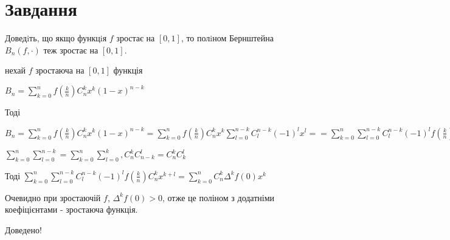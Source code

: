 
\chapter{Завдання \theHchapter}

\begin{tcolorbox}[title=Завдання]
    Доведiть, що якщо функцiя $f$ зростає на $[0, 1]$, то полiном 
    Бернштейна $B_n(f, \cdot)$ теж зростає на $[0, 1]$.
\end{tcolorbox}


нехай $f$ зростаюча на $[0, 1]$ функція 


$ B_n = \sum\limits_{k=0}^{n}f(\frac{k}{n})C_n^kx^k(1 - x)^{n - k} $


Тоді 

$ B_n = \sum\limits_{k=0}^{n}f(\frac{k}{n})C_n^kx^k(1 - x)^{n - k} = 
\sum\limits_{k=0}^{n}f(\frac{k}{n})C_n^kx^k
\sum\limits_{l=0}^{n - k}C_l^{n-k}(-1)^l x^l = 
=\sum\limits_{k=0}^{n}\sum\limits_{l=0}^{n - k}
C_l^{n-k}(-1)^l f(\frac{k}{n})C_n^k x^{k+l}$


$\sum\limits_{k=0}^{n}\sum\limits_{l=0}^{n - k} =
\sum\limits_{k=0}^{n}\sum\limits_{l=0}^{k},
C_n^k C_{n - k}^l = C_n^k C_k^l$


Тоді 
$\sum\limits_{k=0}^{n}\sum\limits_{l=0}^{n - k}
C_l^{n-k}(-1)^l f(\frac{k}{n})C_n^k x^{k+l} = 
\sum\limits_{k=0}^{n}C_n^k \Delta^k f(0) x^k$


Очевидно при зростаючій $f$, $\Delta^k f(0) > 0$, отже це поліном з 
додатніми коефіцієнтами - зростаюча функція. 


Доведено!